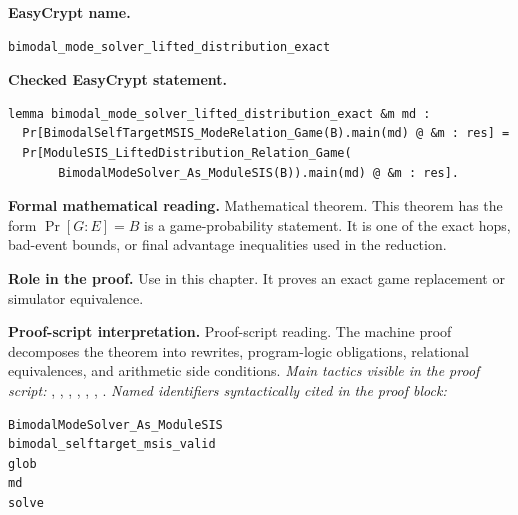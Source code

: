\begin{formaltheorem}
\noindent\textbf{EasyCrypt name.}
\begin{lstlisting}[language=EasyCrypt,basicstyle=\ttfamily\scriptsize]
bimodal_mode_solver_lifted_distribution_exact
\end{lstlisting}
\noindent\textbf{Checked EasyCrypt statement.}
\begin{lstlisting}[language=EasyCrypt,basicstyle=\ttfamily\scriptsize]
lemma bimodal_mode_solver_lifted_distribution_exact &m md :
  Pr[BimodalSelfTargetMSIS_ModeRelation_Game(B).main(md) @ &m : res] =
  Pr[ModuleSIS_LiftedDistribution_Relation_Game(
       BimodalModeSolver_As_ModuleSIS(B)).main(md) @ &m : res].
\end{lstlisting}
\noindent\textbf{Formal mathematical reading.}
Mathematical theorem. This theorem has the form \(\Pr[G:E] = B\) is a game-probability statement.  It is one of the exact hops, bad-event bounds, or final advantage inequalities used in the reduction.

\noindent\textbf{Role in the proof.}
Use in this chapter. It proves an exact game replacement or simulator equivalence.

\noindent\textbf{Proof-script interpretation.}
Proof-script reading. The machine proof decomposes the theorem into rewrites, program-logic obligations, relational equivalences, and arithmetic side conditions.
\emph{Main tactics visible in the proof script:} , , , , , , .
\emph{Named identifiers syntactically cited in the proof block:}
\begin{lstlisting}[language=EasyCrypt,basicstyle=\ttfamily\scriptsize]
BimodalModeSolver_As_ModuleSIS
bimodal_selftarget_msis_valid
glob
md
solve
\end{lstlisting}

\end{formaltheorem}

